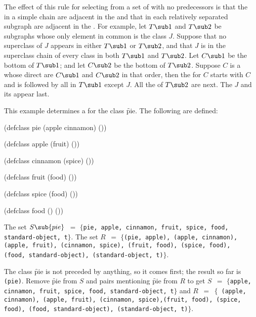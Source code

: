 The effect of this rule for selecting from a set of  with no
predecessors is that the  in a simple  chain are
adjacent in the  and that  in each
relatively separated subgraph are adjacent in the .
For example, let $T\sub 1$ and $T\sub 2$ be subgraphs whose only
element in common is the class $J$\negthinspace.
Suppose that no superclass of $J$ appears in either $T\sub 1$ or $T\sub 2$,
and that $J$ is in the superclass chain of every class in both $T\sub 1$ and $T\sub 2$.
    Let $C\sub 1$ be the bottom of $T\sub 1$; 
and let $C\sub 2$ be the bottom of $T\sub 2$.
Suppose $C$ is a  whose direct 
are $C\sub 1$ and $C\sub 2$ in that order, then the 
for $C$ starts with $C$ and is followed by
all  in $T\sub 1$ except $J$. 
All the  of $T\sub 2$ are next.
The  $J$ and its  appear last.

\endsubsubsection%


This example determines a  for the
class \f{pie}.  The following  are defined:

\code
 (defclass pie (apple cinnamon) ())
 
 (defclass apple (fruit) ())
 
 (defclass cinnamon (spice) ())
 
 (defclass fruit (food) ())

 (defclass spice (food) ())

 (defclass food () ())
\endcode

The set $S\sub{pie}$~$=$ $\{${\tt pie, apple, cinnamon, fruit, spice, food,
standard-object, t}$\}$. The set $R$~$=$ $\{${\tt (pie, apple),
(apple, cinnamon), (apple, fruit), (cinnamon, spice), \hfil\break
(fruit, food), (spice, food), (food, standard-object), (standard-object,
t)}$\}$.

The class \f{pie} is not preceded by anything, so it comes first;
the result so far is {\tt (pie)}.  Remove \f{pie} from $S$ and pairs
mentioning \f{pie} from $R$ to get $S$~$=$ $\{${\tt apple, cinnamon,
fruit, spice, food, standard-object, t}$\}$ and $R$~$=$~$\{${\tt
(apple, cinnamon), (apple, fruit), (cinnamon, spice),\hfil\break (fruit,
food), (spice, food), (food, standard-object),
(standard-object, t)}$\}$.

